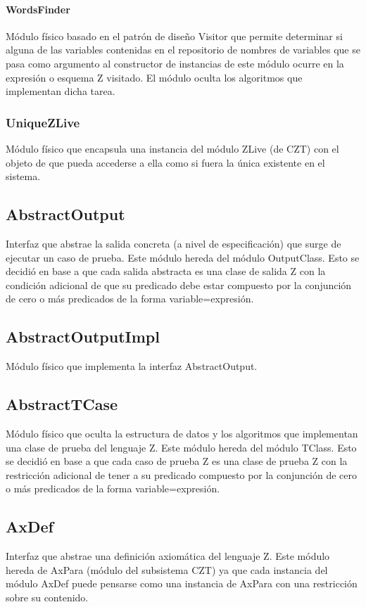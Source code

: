 \documentclass[a4paper,10pt]{report}
\begin{document}
				\paragraph{WordsFinder}
				Módulo físico basado en el patrón de diseño Visitor que permite determinar si alguna de las variables contenidas en el repositorio de nombres de variables que se pasa como argumento al constructor de instancias de este módulo ocurre en la expresión o esquema Z visitado. El módulo oculta los algoritmos que implementan dicha tarea.
			\subsubsection{UniqueZLive}
			Módulo físico que encapsula una instancia del módulo ZLive (de CZT) con el objeto de que pueda accederse a ella como si fuera la única existente en el sistema.
		\subsection{AbstractOutput}
		Interfaz que abstrae la salida concreta (a nivel de especificación) que surge de ejecutar un caso de prueba. Este módulo hereda del módulo OutputClass. Esto se decidió en base a que cada salida abstracta es una clase de salida Z con la condición adicional de que su predicado debe estar compuesto por la conjunción de cero o más predicados de la forma variable=expresión.
		\subsection{AbstractOutputImpl}
		Módulo físico que implementa la interfaz AbstractOutput.
		\subsection{AbstractTCase}
		Módulo físico que oculta la estructura de datos y los algoritmos que implementan una clase de prueba del lenguaje Z. Este módulo hereda del módulo TClass. Esto se decidió en base a que cada caso de prueba Z es una clase de prueba Z con la restricción adicional de tener a su predicado compuesto por la conjunción de cero o más predicados de la forma variable=expresión. 
		\subsection{AxDef}
		Interfaz que abstrae una definición axiomática del lenguaje Z. Este módulo hereda de AxPara (módulo del subsistema CZT) ya que cada instancia del módulo AxDef puede pensarse como una instancia de AxPara con una restricción sobre su contenido.
\end{document}
